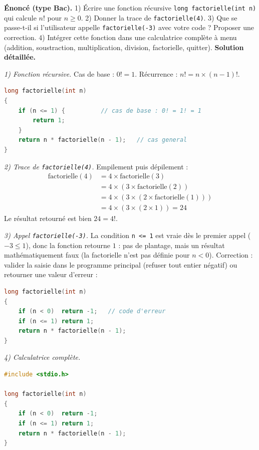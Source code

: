 \documentclass[11pt]{article}
\begin{document}
\begin{exoresolu}
\textbf{Énoncé (type Bac).} 1) Écrire une fonction récursive \texttt{long factorielle(int n)} qui calcule $n!$ pour $n \geq 0$. 2) Donner la trace de \texttt{factorielle(4)}. 3) Que se passe-t-il si l'utilisateur appelle \texttt{factorielle(-3)} avec votre code ? Proposer une correction. 4) Intégrer cette fonction dans une calculatrice complète à menu (addition, soustraction, multiplication, division, factorielle, quitter).
\tcblower
\textbf{Solution détaillée.}

\emph{1) Fonction récursive.} Cas de base : $0! = 1$. Récurrence : $n! = n \times (n-1)!$.
\begin{lstlisting}[language=C]
long factorielle(int n)
{
    if (n <= 1) {          // cas de base : 0! = 1! = 1
        return 1;
    }
    return n * factorielle(n - 1);   // cas general
}
\end{lstlisting}

\emph{2) Trace de \texttt{factorielle(4)}.} Empilement puis dépilement :
\begin{align*}
\text{factorielle}(4) &= 4 \times \text{factorielle}(3)\\
&= 4 \times (3 \times \text{factorielle}(2))\\
&= 4 \times (3 \times (2 \times \text{factorielle}(1)))\\
&= 4 \times (3 \times (2 \times 1)) = 24
\end{align*}
Le résultat retourné est bien $24 = 4!$.

\emph{3) Appel \texttt{factorielle(-3)}.} La condition \texttt{n <= 1} est vraie dès le premier appel ($-3 \leq 1$), donc la fonction retourne $1$ : pas de plantage, mais un résultat mathématiquement faux (la factorielle n'est pas définie pour $n < 0$). Correction : valider la saisie dans le programme principal (refuser tout entier négatif) ou retourner une valeur d'erreur :
\begin{lstlisting}[language=C]
long factorielle(int n)
{
    if (n < 0)  return -1;   // code d'erreur
    if (n <= 1) return 1;
    return n * factorielle(n - 1);
}
\end{lstlisting}

\emph{4) Calculatrice complète.}
\begin{lstlisting}[language=C]
#include <stdio.h>

long factorielle(int n)
{
    if (n < 0)  return -1;
    if (n <= 1) return 1;
    return n * factorielle(n - 1);
}


\end{lstlisting}
\end{exoresolu}
\end{document}
